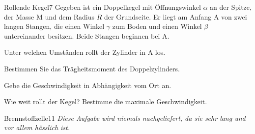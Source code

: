 \begin{problem}{Rollende Kegel}{7}
Gegeben ist ein Doppelkegel mit Öffnungswinkel $\alpha$ an der Spitze, der Masse M und dem Radius $R$ der Grundseite. Er liegt am Anfang A  von zwei langen Stangen, die einen Winkel $\gamma$ zum Boden und einen Winkel $\beta$ untereinander besitzen. Beide Stangen beginnen bei A.
\begin{abcenum}
\item Unter welchen Umständen rollt der Zylinder in A los.
\item Bestimmen Sie das Trägheitsmoment des Doppelzylinders.
\item Gebe die Geschwindigkeit in Abhängigkeit vom Ort an.
\item Wie weit rollt der Kegel? Bestimme die maximale Geschwindigkeit.
\end{abcenum}
\end{problem}

\begin{problem}{Brennstoffzelle}{11}
\textit{Diese Aufgabe wird niemals nachgeliefert, da sie sehr lang und vor allem hässlich ist.}
\end{problem}


